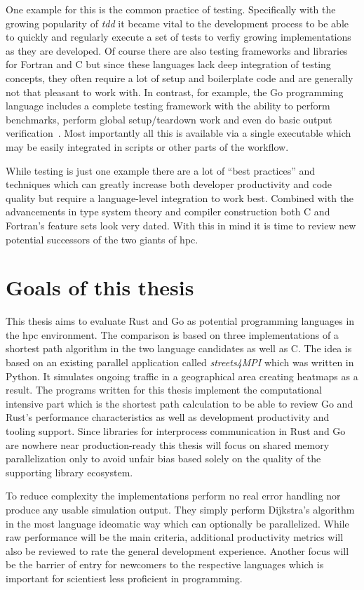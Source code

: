 One example for this is the common practice of testing. Specifically with the growing popularity of \textit{\gls{tdd}} it became vital to the development process to be able to quickly and regularly execute a set of tests to verfiy growing implementations as they are developed. Of course there are also testing frameworks and libraries for Fortran and C but since these languages lack deep integration of testing concepts, they often require a lot of setup and boilerplate code and are generally not that pleasant to work with. In contrast, for example, the Go programming language includes a complete testing framework with the ability to perform benchmarks, perform global setup/teardown work and even do basic output verification~\cite{go_doc_testing}. Most importantly all this is available via a single executable  which may be easily integrated in scripts or other parts of the workflow.

While testing is just one example there are a lot of ``best practices'' and techniques which can greatly increase both developer productivity and code quality but require a language-level integration to work best. Combined with the advancements in type system theory and compiler construction both C and Fortran's feature sets look very dated. With this in mind it is time to review new potential successors of the two giants of \gls{hpc}.

\section{Goals of this thesis}
\label{sec:Introduction::Goals}

This thesis aims to evaluate Rust and Go as potential programming languages in the \gls{hpc} environment. The comparison is based on three implementations of a shortest path algorithm in the two language candidates as well as C. The idea is based on an existing parallel application called \textit{streets4MPI} which was written in Python. It simulates ongoing traffic in a geographical area creating heatmaps as a result. The programs written for this thesis implement the computational intensive part which is the shortest path calculation to be able to review Go and Rust's performance characteristics as well as development productivity and tooling support. Since libraries for interprocess communication in Rust and Go are nowhere near production-ready this thesis will focus on shared memory parallelization only to avoid unfair bias based solely on the quality of the supporting library ecosystem.

To reduce complexity the implementations perform no real error handling nor produce any usable simulation output. They simply perform Dijkstra's algorithm in the most language ideomatic way which can optionally be parallelized. While raw performance will be the main criteria, additional productivity metrics will also be reviewed to rate the general development experience. Another focus will be the barrier of entry for newcomers to the respective languages which is important for scientiest less proficient in programming.
